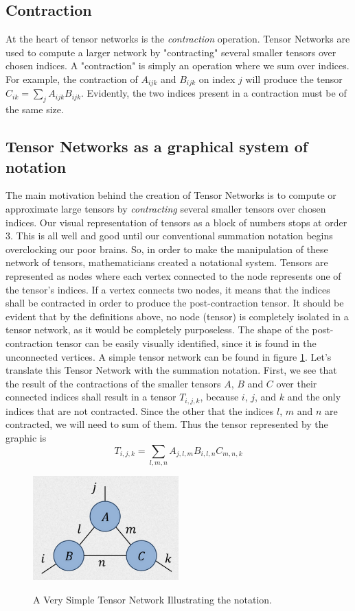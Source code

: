 \documentclass{article}
\theoremstyle{definition}
\theoremstyle{definition}
\begin{document}
\subsection{Contraction}
At the heart of tensor networks is the {\it contraction} operation.
Tensor Networks are used to compute a larger network by "contracting" several
smaller tensors over chosen indices. A "contraction" is simply an operation 
where we sum over indices. For example, the contraction of $A_{ijk}$ and 
$B_{ijk}$ on index $j$ will produce the tensor $C_{ik} = \sum_{j} A_{ijk} B_{ijk}$.
Evidently, the two indices present in a contraction must be of the same size.

\subsection{Tensor Networks as a graphical system of notation}
The main motivation behind the creation of Tensor Networks is to compute or approximate large tensors by {\it contracting} several smaller tensors over chosen indices. Our visual representation of tensors as a block of numbers stops at order $3$. 
This is all well and good until our conventional summation notation begins overclocking our poor brains. 
So, in order to make the manipulation of these network of tensors, mathematicians created a notational system. 
Tensors are represented as nodes where each vertex connected to the node represents one of the tensor's indices. 
If a vertex connects two nodes, it means that the indices shall be contracted in order to produce the post-contraction tensor. 
It should be evident that by the definitions above, no node (tensor) is completely isolated in a tensor network, as it would be completely purposeless. 
The shape of the post-contraction tensor can be easily visually identified, since it is found in the unconnected vertices.
A simple tensor network can be found in figure \ref{fig:tensor_net}.
Let's translate this Tensor Network with the summation notation. First, we see that the result of the contractions of the smaller tensors $A$, $B$ and $C$ over their connected indices shall result in a tensor $T_{i, j, k}$, because $i$, $j$, and $k$ and the only indices that are not contracted. Since the other that the indices $l$, $m$ and $n$ are contracted, we will need to sum of them. Thus the tensor represented by the graphic is
\[ 
    T_{i, j, k} = \sum_{l, m, n} A_{j, l, m} B_{i, l, n} C_{m, n, k}
\]

\begin{figure}[hbt!]
    \centering
    \caption{A Very Simple Tensor Network Illustrating the notation.}
    \includegraphics[width=0.5\textwidth]{images/2023-03-21-10-22-39.png}
    \label{fig:tensor_net}
\end{figure}
\end{document}
